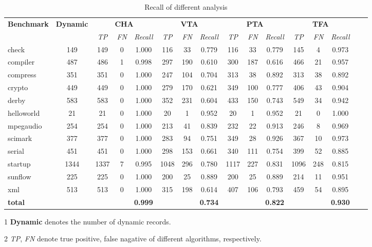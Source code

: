 \documentclass{fac}
\begin{document}
\begin{table} %
\begin{threeparttable}[b]
\begin{tabular*}{1.0\textwidth}{|l|c|c|c|c|c|c|c|c|c|c|c|c|c|c|c|}
	\hline
	\multirow{2}{*}{\textbf{Benchmark}} & \multirow{2}{*}{\textbf{Dynamic}\hspace{-1pt}} & \multicolumn{3}{c|}{\textbf{CHA}} & \multicolumn{3}{c|}{\textbf{VTA}} & \multicolumn{3}{c|}{\textbf{PTA}} & \multicolumn{3}{c|}{\textbf{TFA}}\\
\cline{3-14} &  & \textit{TP} & \textit{FN} & \hspace{1pt}\textit{Recall} & \textit{TP} & \textit{FN} & \hspace{1pt}\textit{Recall}& \textit{TP} & \textit{FN} & \hspace{1pt}\textit{Recall} & \textit{TP} & \textit{FN} & \textit{Recall}\\
	\hline
	\hline
check & 149 & 149 & 0 & 1.000 & 116 & 33 & 0.779 & 116 & 33 & 0.779 & 145 & 4 & 0.973\\
compiler & 487 & 486 & 1 & 0.998 & 297 & 190 & 0.610 & 300 & 187 & 0.616 & 466 & 21 & 0.957\\
compress & 351 & 351 & 0 & 1.000 & 247 & 104 & 0.704 & 313 & 38 & 0.892 & 313 & 38 & 0.892\\
crypto & 449 & 449 & 0 & 1.000 & 279 & 170 & 0.621 & 349 & 100 & 0.777 & 406 & 43 & 0.904\\
derby & 583 & 583 & 0 & 1.000 & 352 & 231 & 0.604 & 433 & 150 & 0.743 & 549 & 34 & 0.942\\
helloworld & 21 & 21 & 0 & 1.000 & 20 & 1 & 0.952 & 20 & 1 & 0.952 & 21 & 0 & 1.000\\
mpegaudio & 254 & 254 & 0 & 1.000 & 213 & 41 & 0.839 & 232 & 22 & 0.913 & 246 & 8 & 0.969\\
scimark & 377 & 377 & 0 & 1.000 & 283 & 94 & 0.751 & 349 & 28 & 0.926 & 367 & 10 & 0.973\\
serial & 451 & 451 & 0 & 1.000 & 298 & 153 & 0.661 & 340 & 111 & 0.754 & 399 & 52 & 0.885\\
startup & 1344 & 1337 & 7 & 0.995 & 1048 & 296 & 0.780 & 1117 & 227 & 0.831 & 1096 & 248 & 0.815\\
sunflow & 225 & 225 & 0 & 1.000 & 200 & 25 & 0.889 & 200 & 25 & 0.889 & 214 & 11 & 0.951\\
xml & 513 & 513 & 0 & 1.000 & 315 & 198 & 0.614 & 407 & 106 & 0.793 & 459 & 54 & 0.895\\
\hline
\textbf{total} & & & & \textbf{0.999} & & & \textbf{0.734} & & & \textbf{0.822} & & & \textbf{0.930} \\
	\hline
\end{tabular*}
\begin{tablenotes}
  \item[1] \textbf{Dynamic} denotes the number of dynamic records.
  \item[2] \textit{TP}, \textit{FN} denote true positive, false nagative of different algorithms, respectively.
\end{tablenotes}
\caption{Recall of different analysis}\label{table:recall}
\end{threeparttable}
\end{table}
\end{document}
